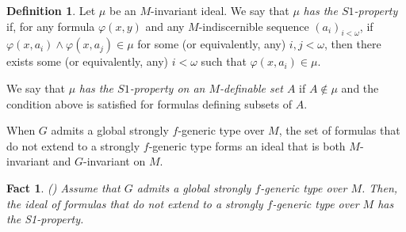 \documentclass[12pt]{article}
\newcommand{\0}{\emptyset}
\theoremstyle{plain}%
\newtheorem{fact}[thm]{Fact}
\theoremstyle{definition}
\newtheorem{defn}[thm]{Definition}
\theoremstyle{remark}
\begin{document}
\begin{defn} Let $\mu$ be an $M$-invariant ideal. We say that $\mu$ \emph{has the $S1$-property} if, for any formula $\varphi(x,y)$ and any $M$-indiscernible sequence $(a_i)_{i < \omega}$, if $\varphi(x,a_i) \land \varphi(x,a_j) \in \mu$ for some (or equivalently, any) $i, j < \omega$, then there exists some (or equivalently, any) $i < \omega$ such that $\varphi(x,a_i) \in \mu$.

We say that $\mu$ \emph{has the $S1$-property on an $M$-definable set $A$} if $A \not\in \mu$ and the condition above is satisfied for formulas defining subsets of $A$.

\end{defn}
When $G$ admits a global strongly $f$-generic type over $M$, the set of formulas that do not extend to a strongly $f$-generic type forms an ideal that is both $M$-invariant and $G$-invariant on $M$.
\begin{fact}\label{genericity_ideal} (\cite[Lemma 3.14]{MOS20})
Assume that $G$ admits a global strongly $f$-generic type over $M$. Then, the ideal of formulas that do not extend to a strongly $f$-generic type over $M$ has the S1-property.
\end{fact}
\end{document}
